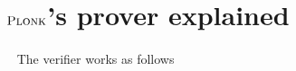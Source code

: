 \documentclass[runningheads,11pt]{llncs}
\theoremstyle{definition}
\begin{document}



\appendix
\section{$\textsc{Plonk}$'s prover explained}
\label{sec:plonk_explained}

\paragraph{}


\paragraph{}\ \newline
The \plonk{} verifier works as follows
\end{document}
